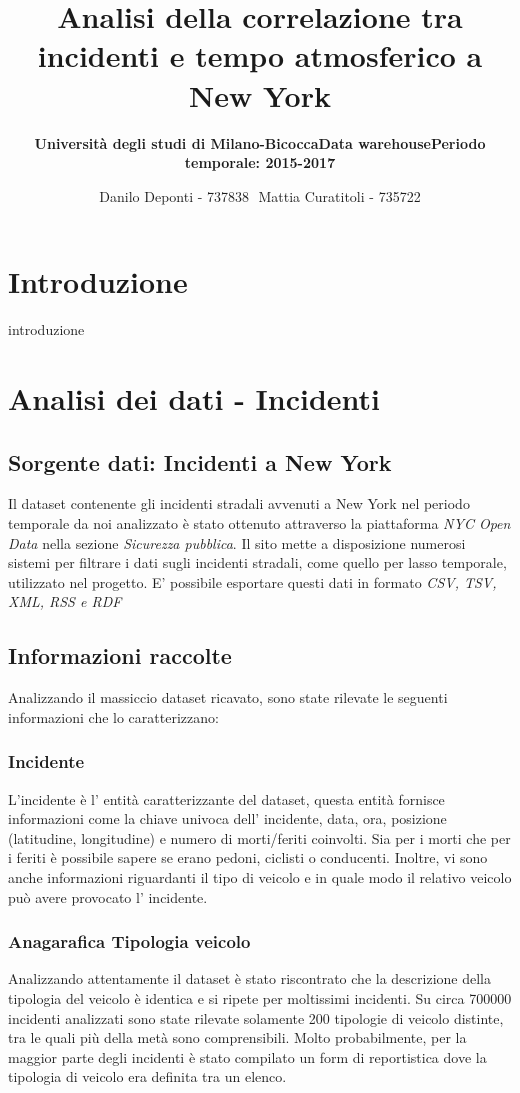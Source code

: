 \documentclass[12pt, a4paper]{scrartcl}
\subtitle{\textbf{Università degli studi di Milano-Bicocca}}
\subtitle{\textbf{Data warehouse}}
\title{\textbf{Analisi della correlazione tra incidenti e tempo atmosferico a New York}}
\subtitle{\textbf{Periodo temporale: 2015-2017}}
\author{Danilo Deponti - 737838 $    $ Mattia Curatitoli - 735722} \date{}
\begin{document}
\maketitle
 
\section*{Introduzione}
introduzione
\newpage
\section*{Analisi dei dati - Incidenti}

\subsection*{Sorgente dati: Incidenti a New York}
Il dataset contenente gli incidenti stradali avvenuti a New York nel periodo temporale da noi analizzato è stato ottenuto attraverso la piattaforma \emph{NYC Open Data} nella sezione \emph{Sicurezza pubblica}.
Il sito mette a disposizione numerosi sistemi per filtrare i dati sugli incidenti stradali, come quello per lasso temporale, utilizzato nel progetto. E' possibile esportare questi dati in formato \emph{CSV, TSV, XML, RSS e RDF}
\subsection*{Informazioni raccolte}
Analizzando il massiccio dataset ricavato, sono state rilevate le seguenti informazioni che lo caratterizzano:
\subsubsection*{Incidente}
L'incidente è l' entità caratterizzante del dataset, questa entità fornisce informazioni come la chiave univoca dell' incidente, data, ora, posizione (latitudine, longitudine) e numero di morti/feriti coinvolti.
Sia per i morti che per i feriti è possibile sapere se erano pedoni, ciclisti o conducenti.
Inoltre, vi sono anche informazioni riguardanti il tipo di veicolo e in quale modo il relativo veicolo può avere provocato l' incidente.
\subsubsection*{Anagarafica Tipologia veicolo}
Analizzando attentamente il dataset è stato riscontrato che la descrizione della tipologia del veicolo è identica e si ripete per moltissimi incidenti. Su circa 700000 incidenti analizzati sono state rilevate solamente 200 tipologie di veicolo distinte, tra le quali più della metà sono comprensibili. Molto probabilmente, per la maggior parte degli incidenti è stato compilato un form di reportistica dove la tipologia di veicolo era definita tra un elenco. 
\end{document}
